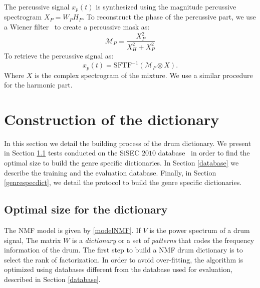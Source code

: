 \documentclass{article}
\begin{document}
The percussive signal $x_p(t)$ is synthesized using the magnitude percussive spectrogram $X_P = W_PH_P$. To reconstruct the phase of the percussive part, we use a Wiener filter~\cite{liutkus2015generalized} to create a percussive mask as:
\begin{equation}
\mathcal{M}_P = \frac{X_P^2}{X_H^2 + X_P^2}
\end{equation} 
To retrieve the percussive signal as: 
\begin{equation}
x_p(t) = \mbox{SFTF}^{-1}(\mathcal{M}_P \otimes X).
\end{equation}
Where $X$ is the complex spectrogram of the mixture.
We use a similar procedure for the harmonic part.
%




\section{Construction of the dictionary}\label{ConstrucDict}

In this section we detail the building process of the drum dictionary. We present in Section \ref{optimalsize} tests conducted on the SiSEC $2010$ database~\cite{SiSec10} in order to find the optimal size to build the genre specific dictionaries. In Section \ref{database} we describe the training and the evaluation database. Finally, in Section \ref{genrespecdict}, we detail the protocol to build the genre specific dictionaries. 

\subsection{Optimal size for the dictionary}\label{optimalsize}


The NMF model is given by \eqref{modelNMF}. If $V$ is the power spectrum of a drum signal, The matrix $W$ is a {\em dictionary} or a set of {\em patterns} that codes the frequency information of the drum. The first step to build a NMF drum dictionary is to select the rank of factorization. In order to avoid over-fitting, the algorithm is optimized using databases different from the database used for evaluation, described in Section \ref{database}. 
\end{document}
